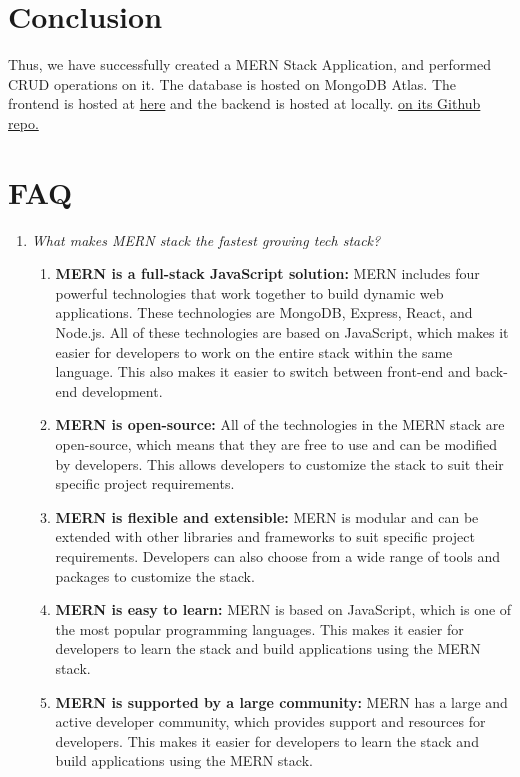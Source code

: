 \documentclass[11pt]{article}
\begin{document}
\section{Conclusion}
Thus, we have successfully created a MERN Stack Application, and performed CRUD operations on it. The database is hosted on MongoDB Atlas. The frontend is hosted at \href{http://noveltea.surge.sh/}{here} and the backend is hosted at locally. \href{https://github.com/KrishnarajT/NovelTea-Library}{on its Github repo. }

\clearpage

\section{FAQ}
\begin{enumerate}
    \item \textit{ What makes MERN stack the fastest growing tech stack?}
          \noindent
          \begin{enumerate}
              \item \textbf{MERN is a full-stack JavaScript solution:} MERN includes four powerful technologies that work together to build dynamic web applications. These technologies are MongoDB, Express, React, and Node.js. All of these technologies are based on JavaScript, which makes it easier for developers to work on the entire stack within the same language. This also makes it easier to switch between front-end and back-end development.
              \item \textbf{MERN is open-source:} All of the technologies in the MERN stack are open-source, which means that they are free to use and can be modified by developers. This allows developers to customize the stack to suit their specific project requirements.
              \item \textbf{MERN is flexible and extensible:} MERN is modular and can be extended with other libraries and frameworks to suit specific project requirements. Developers can also choose from a wide range of tools and packages to customize the stack.
              \item \textbf{MERN is easy to learn:} MERN is based on JavaScript, which is one of the most popular programming languages. This makes it easier for developers to learn the stack and build applications using the MERN stack.
              \item \textbf{MERN is supported by a large community:} MERN has a large and active developer community, which provides support and resources for developers. This makes it easier for developers to learn the stack and build applications using the MERN stack.

\end{enumerate}
\end{enumerate}
\end{document}
